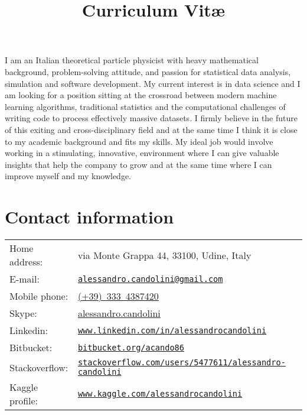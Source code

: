 \documentclass[10pt,a4paper]{moderncv}   %
\title{%
 Curriculum Vit\ae
}
\makeatletter
\newenvironment{mycvline}{
      \begin{tabular*}{\textwidth}{ R{\hintscolumnwidth}
	    @{\extracolsep{\columnsep}}l}
   }{
\end{tabular*}
}
\newcommand{\mail}[1]{\href{mailto:#1}{\texttt{#1}}}
\newcommand{\website}[2]{\href{#1#2}{\texttt{#2}}}
\newcommand{\skype}[1]{\href{skype:#1?userinfo}{#1}}%
\makeatother
\begin{document}
\makecvtitle

   


I am an Italian theoretical particle physicist with heavy mathematical
background, problem-solving attitude, and passion for statistical data
analysis, simulation and software development.
My current interest is in data science and I am looking for a position sitting at the crossroad
between 
modern machine learning algorithms, traditional statistics and the computational
challenges of writing code to process effectively massive datasets. 
I firmly believe in the future of this exiting and cross-disciplinary field and at the same time I think it is
close to my academic background  and fits my skills. 
My ideal job would involve working in a stimulating, innovative,
environment where I can give
valuable insights that help the 
company to grow  and at the same time where I can  
improve myself and my knowledge.


\section{Contact information}

\begin{mycvline}
     Home address: & via Monte Grappa 44, 33100, Udine, Italy  \\
      E-mail: & \mail{alessandro.candolini@gmail.com} \\
    Mobile phone: & 
    \href{tel:00393334387420}{(+39)~333~4387420}\\
    Skype: & \skype{alessandro.candolini} \\
    Linkedin: & \website{https://}{www.linkedin.com/in/alessandrocandolini}  \\
    Bitbucket:  & \website{https://}{bitbucket.org/acando86} \\
    Stackoverflow:  & 
   \website{http://}{stackoverflow.com/users/5477611/alessandro-candolini} \\
    Kaggle profile:  & \website{http://}{www.kaggle.com/alessandrocandolini}
\end{mycvline}
\end{document}
